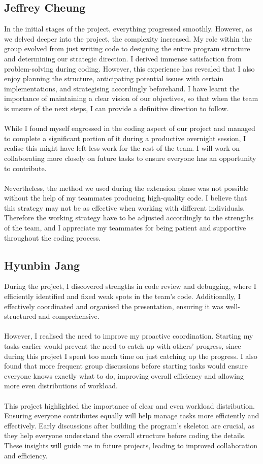 \documentclass[10pt]{article}
\begin{document}
\subsection{Jeffrey Cheung}
In the initial stages of the project, everything progressed smoothly. However, as we delved deeper into the project, the complexity increased. My role within the group evolved from just writing code to designing the entire program structure and determining our strategic direction. I derived immense satisfaction from problem-solving during coding. However, this experience has revealed that I also enjoy planning the structure, anticipating potential issues with certain implementations, and strategising accordingly beforehand. I have learnt the importance of maintaining a clear vision of our objectives, so that when the team is unsure of the next steps, I can provide a definitive direction to follow.\\
\\
While I found myself engrossed in the coding aspect of our project and managed to complete a significant portion of it during a productive overnight session, I realise this might have left less work for the rest of the team. I will work on collaborating more closely on future tasks to ensure everyone has an opportunity to contribute. \\
\\
Nevertheless, the method we used during the extension phase was not possible without the help of my teammates producing high-quality code. I believe that this strategy may not be as effective when working with different individuals. Therefore the working strategy have to be adjusted accordingly to the strengths of the team, and I appreciate my teammates for being patient and supportive throughout the coding process.


\subsection{Hyunbin Jang}
During the project, I discovered strengths in code review and debugging, where I efficiently identified and fixed weak spots in the team's code. Additionally, I effectively coordinated and organised the presentation, ensuring it was well-structured and comprehensive.\\
\\However, I realised the need to improve my proactive coordination. Starting my tasks earlier would prevent the need to catch up with others' progress, since during this project I spent too much time on just catching up the progress. I also found that more frequent group discussions before starting tasks would ensure everyone knows exactly what to do, improving overall efficiency and allowing more even distributions of workload.\\
\\This project highlighted the importance of clear and even workload distribution. Ensuring everyone contributes equally will help manage tasks more efficiently and effectively. Early discussions after building the program's skeleton are crucial, as they help everyone understand the overall structure before coding the details. These insights will guide me in future projects, leading to improved collaboration and efficiency.
\end{document}
